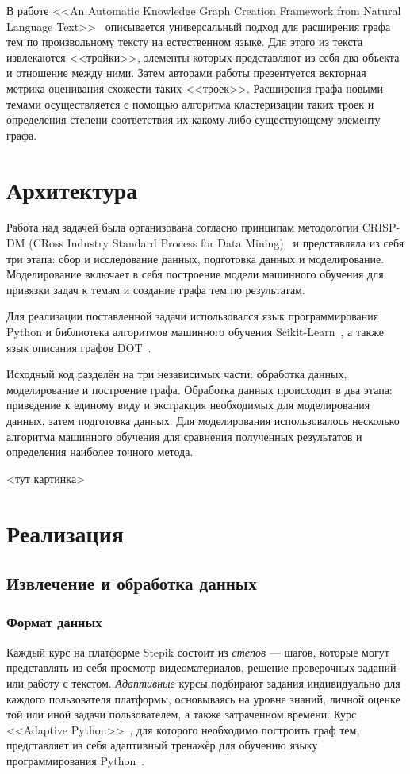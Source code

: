 \documentclass[14pt]{matmex-diploma-custom}
\begin{document}
В работе <<An Automatic Knowledge Graph Creation Framework from
Natural Language Text>>~\cite{autograph} описывается универсальный подход для расширения графа тем по произвольному тексту на естественном языке. Для этого из текста извлекаются <<тройки>>, элементы которых представляют из себя два объекта и отношение между ними. Затем авторами работы презентуется векторная метрика оценивания схожести таких <<троек>>. Расширения графа новыми темами осуществляется с помощью алгоритма кластеризации таких троек и определения степени соответствия их какому-либо существующему элементу графа.

\section{Архитектура}

Работа над задачей была организована согласно принципам методологии CRISP-DM (CRoss Industry Standard Process for Data Mining)~\cite{crispdm} и представляла из себя три этапа: сбор и исследование данных, подготовка данных и моделирование. Моделирование включает в себя построение модели машинного обучения для привязки задач к темам и создание графа тем по результатам.

Для реализации поставленной задачи использовался язык программирования Python и библиотека алгоритмов машинного обучения Scikit-Learn~\cite{sklearn}, а также язык описания графов DOT~\cite{dot}.

Исходный код разделён на три независимых части: обработка данных, моделирование и построение графа. Обработка данных происходит в два этапа: приведение к единому виду и экстракция необходимых для моделирования данных, затем подготовка данных. Для моделирования использовалось несколько алгоритма машинного обучения для сравнения полученных результатов и определения наиболее точного метода.

<тут картинка>

\section{Реализация}
\subsection{Извлечение и обработка данных}
\subsubsection{Формат данных}
Каждый курс на платформе Stepik состоит из \textit{степов} --- шагов, которые могут представлять из себя просмотр видеоматериалов, решение проверочных заданий или работу с текстом. \textit{Адаптивные} курсы подбирают задания индивидуально для каждого пользователя платформы, основываясь на уровне знаний, личной оценке той или иной задачи пользователем, а также затраченном времени. Курс <<Adaptive Python>>~\cite{adapython}, для которого необходимо построить граф тем, представляет из себя адаптивный тренажёр для обучению языку программирования Python~\cite{Python}. 
\end{document}
